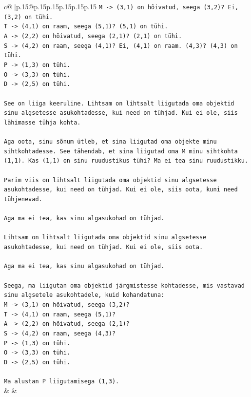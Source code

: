 \documentclass{article}
\begin{document}
{\begin{supertabular}{c@{$\;$}|p{.15\linewidth}@{}p{.15\linewidth}p{.15\linewidth}p{.15\linewidth}p{.15\linewidth}p{.15\linewidth}}
{{{\texttt{M {-}> (3,1) on hõivatud, seega (3,2)? Ei, (3,2) on tühi.} \\
\texttt{T {-}> (4,1) on raam, seega (5,1)? (5,1) on tühi.} \\
\texttt{A {-}> (2,2) on hõivatud, seega (2,1)? (2,1) on tühi.} \\
\texttt{S {-}> (4,2) on raam, seega (4,1)? Ei, (4,1) on raam. (4,3)? (4,3) on tühi.} \\
\texttt{P {-}> (1,3) on tühi.} \\
\texttt{O {-}> (3,3) on tühi.} \\
\texttt{D {-}> (2,5) on tühi.} \\
\\ 
\texttt{See on liiga keeruline. Lihtsam on lihtsalt liigutada oma objektid sinu algsetesse asukohtadesse, kui need on tühjad. Kui ei ole, siis lähimasse tühja kohta.} \\
\\ 
\texttt{Aga oota, sinu sõnum ütleb, et sina liigutad oma objekte minu sihtkohtadesse. See tähendab, et sina liigutad oma M minu sihtkohta (1,1). Kas (1,1) on sinu ruudustikus tühi? Ma ei tea sinu ruudustikku.} \\
\\ 
\texttt{Parim viis on lihtsalt liigutada oma objektid sinu algsetesse asukohtadesse, kui need on tühjad. Kui ei ole, siis oota, kuni need tühjenevad.} \\
\\ 
\texttt{Aga ma ei tea, kas sinu algasukohad on tühjad.} \\
\\ 
\texttt{Lihtsam on lihtsalt liigutada oma objektid sinu algsetesse asukohtadesse, kui need on tühjad. Kui ei ole, siis oota.} \\
\\ 
\texttt{Aga ma ei tea, kas sinu algasukohad on tühjad.} \\
\\ 
\texttt{Seega, ma liigutan oma objektid järgmistesse kohtadesse, mis vastavad sinu algsetele asukohtadele, kuid kohandatuna:} \\
\texttt{M {-}> (3,1) on hõivatud, seega (3,2)?} \\
\texttt{T {-}> (4,1) on raam, seega (5,1)?} \\
\texttt{A {-}> (2,2) on hõivatud, seega (2,1)?} \\
\texttt{S {-}> (4,2) on raam, seega (4,3)?} \\
\texttt{P {-}> (1,3) on tühi.} \\
\texttt{O {-}> (3,3) on tühi.} \\
\texttt{D {-}> (2,5) on tühi.} \\
\\ 
\texttt{Ma alustan P liigutamisega (1,3).} \\
            }
        }
    }
    & & \\ \\


\end{supertabular}}
\end{document}
